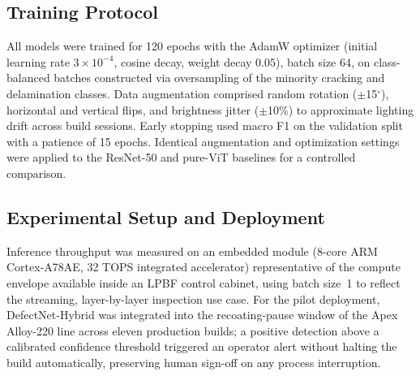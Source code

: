 \subsection{Training Protocol}
All models were trained for 120 epochs with the AdamW optimizer (initial learning rate $3\times10^{-4}$, cosine decay, weight decay $0.05$), batch size 64, on class-balanced batches constructed via oversampling of the minority cracking and delamination classes. Data augmentation comprised random rotation ($\pm$15$^\circ$), horizontal and vertical flips, and brightness jitter ($\pm$10\%) to approximate lighting drift across build sessions. Early stopping used macro F1 on the validation split with a patience of 15 epochs. Identical augmentation and optimization settings were applied to the ResNet-50 and pure-ViT baselines for a controlled comparison.

\subsection{Experimental Setup and Deployment}
Inference throughput was measured on an embedded module (8-core ARM Cortex-A78AE, 32 TOPS integrated accelerator) representative of the compute envelope available inside an LPBF control cabinet, using batch size~1 to reflect the streaming, layer-by-layer inspection use case. For the pilot deployment, DefectNet-Hybrid was integrated into the recoating-pause window of the Apex Alloy-220 line across eleven production builds; a positive detection above a calibrated confidence threshold triggered an operator alert without halting the build automatically, preserving human sign-off on any process interruption.

